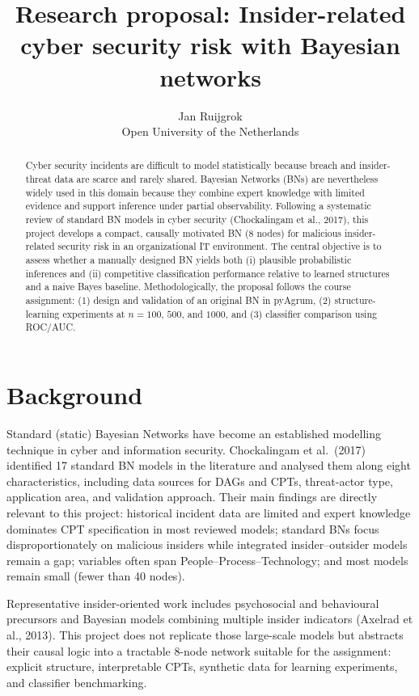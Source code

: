 \documentclass[11pt,a4paper]{article}
\title{Research proposal: Insider-related cyber security risk with Bayesian networks}
\author{Jan Ruijgrok\\Open University of the Netherlands}
\date{}
\begin{document}
\maketitle

\begin{abstract}
Cyber security incidents are difficult to model statistically because breach and insider-threat data are scarce and rarely shared. Bayesian Networks (BNs) are nevertheless widely used in this domain because they combine expert knowledge with limited evidence and support inference under partial observability. Following a systematic review of standard BN models in cyber security (Chockalingam et al., 2017), this project develops a compact, causally motivated BN (8 nodes) for malicious insider-related security risk in an organizational IT environment. The central objective is to assess whether a manually designed BN yields both (i) plausible probabilistic inferences and (ii) competitive classification performance relative to learned structures and a naive Bayes baseline. Methodologically, the proposal follows the course assignment: (1) design and validation of an original BN in pyAgrum, (2) structure-learning experiments at $n=100$, $500$, and $1000$, and (3) classifier comparison using ROC/AUC.
\end{abstract}

\section{Background}

Standard (static) Bayesian Networks have become an established modelling technique in cyber and information security. Chockalingam et al.\ (2017) identified 17 standard BN models in the literature and analysed them along eight characteristics, including data sources for DAGs and CPTs, threat-actor type, application area, and validation approach. Their main findings are directly relevant to this project: historical incident data are limited and expert knowledge dominates CPT specification in most reviewed models; standard BNs focus disproportionately on malicious insiders while integrated insider--outsider models remain a gap; variables often span People--Process--Technology; and most models remain small (fewer than 40 nodes).

Representative insider-oriented work includes psychosocial and behavioural precursors and Bayesian models combining multiple insider indicators (Axelrad et al., 2013). This project does not replicate those large-scale models but abstracts their causal logic into a tractable 8-node network suitable for the assignment: explicit structure, interpretable CPTs, synthetic data for learning experiments, and classifier benchmarking.
\end{document}
